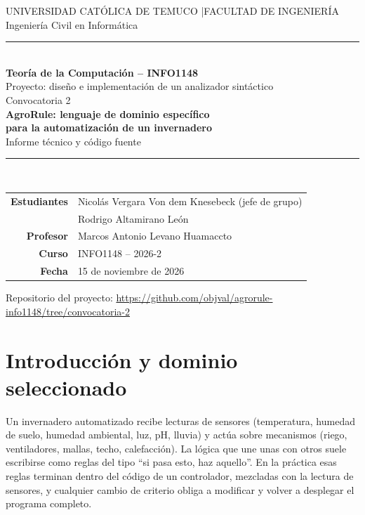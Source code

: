 \documentclass[11pt,letterpaper]{article}
\begin{document}
\begin{titlepage}
\centering
\vspace*{2.4cm}
{\small UNIVERSIDAD CATÓLICA DE TEMUCO \quad|\quad FACULTAD DE INGENIERÍA}\\[2pt]
{\small Ingeniería Civil en Informática}\\[14pt]
\rule{\textwidth}{0.6pt}\\[10pt]
{\Large\bfseries Teoría de la Computación -- INFO1148}\\[12pt]
{\large Proyecto: diseño e implementación de un analizador sintáctico\\[2pt]Convocatoria 2}\\[10pt]
{\large\bfseries AgroRule: lenguaje de dominio específico\\ para la automatización de un invernadero}\\[10pt]
{\small Informe técnico y código fuente}\\[18pt]
\rule{\textwidth}{0.6pt}\\[16pt]

\begin{tabular}{rl}
\textbf{Estudiantes} & Nicolás Vergara Von dem Knesebeck (jefe de grupo)\\
                     & Rodrigo Altamirano León\\[6pt]
\textbf{Profesor}    & Marcos Antonio Levano Huamaccto\\
\textbf{Curso}       & INFO1148 -- 2026-2\\
\textbf{Fecha}       & 15 de noviembre de 2026\\
\end{tabular}

\vfill
{\footnotesize Repositorio del proyecto: \url{https://github.com/objval/agrorule-info1148/tree/convocatoria-2}}
\end{titlepage}

\begingroup
\renewcommand{\contentsname}{Índice}
\small
\setlength{\parskip}{0pt}
\tableofcontents
\endgroup
\newpage

\section{Introducción y dominio seleccionado}

Un invernadero automatizado recibe lecturas de sensores (temperatura, humedad de suelo, humedad ambiental, luz, pH, lluvia) y actúa sobre mecanismos (riego, ventiladores, mallas, techo, calefacción). La lógica que une unas con otros suele escribirse como reglas del tipo ``si pasa esto, haz aquello''. En la práctica esas reglas terminan dentro del código de un controlador, mezcladas con la lectura de sensores, y cualquier cambio de criterio obliga a modificar y volver a desplegar el programa completo.
\end{document}

